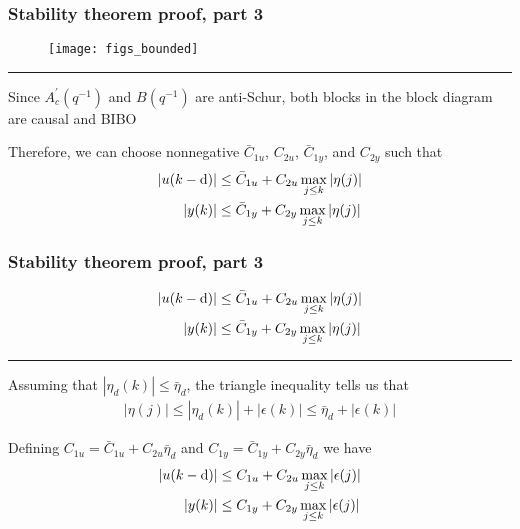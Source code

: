 \begin{frame}
    \frametitle{Stability theorem proof, part 3}

    \begin{figure}
        \texttt{[image: figs\_bounded]}\\
    \end{figure}
    \hrule{\hfill}
    
    Since $A_c^{'}(q^{-1})$ and $B(q^{-1})$ are anti-Schur, both blocks in the block diagram are causal and BIBO
    \pause
    
    Therefore, we can choose nonnegative $\bar{C}_{1u}$, $C_{2u}$, $\bar{C}_{1y}$, and $C_{2y}$ such that
    \begin{align*}
        |u(k-\textrm{d})| & \leq \bar{C}_{1u} + C_{2u} \max_{j \leq k} |\eta(j)| \\
        |y(k)| & \leq \bar{C}_{1y} + C_{2y} \max_{j \leq k} |\eta(j)|
    \end{align*}

\end{frame}

\begin{frame}
    \frametitle{Stability theorem proof, part 3}

    \begin{align*}
        |u(k-\textrm{d})| & \leq \bar{C}_{1u} + C_{2u} \max_{j \leq k} |\eta(j)| \\
        |y(k)| & \leq \bar{C}_{1y} + C_{2y} \max_{j \leq k} |\eta(j)|
    \end{align*}
    \hrule{\hfill}
    
    Assuming that $|\eta_d(k)| \leq \bar{\eta}_d$, the triangle inequality tells us that 
    \begin{align*}
        |\eta(j)| \leq |\eta_d(k)| + |\epsilon(k)| \leq \bar{\eta}_d + |\epsilon(k)|
    \end{align*}
    \paused
    
    Defining $C_{1u} = \bar{C}_{1u} + C_{2u} \bar{\eta}_d$ and $C_{1y} = \bar{C}_{1y} + C_{2y} \bar{\eta}_d$ we have
    \begin{align*}
        |u(k-\textrm{d})| & \leq C_{1u} + C_{2u} \max_{j \leq k} |\epsilon(j)| \\
        |y(k)| & \leq C_{1y} + C_{2y} \max_{j \leq k} |\epsilon(j)|
    \end{align*}

\end{frame}


